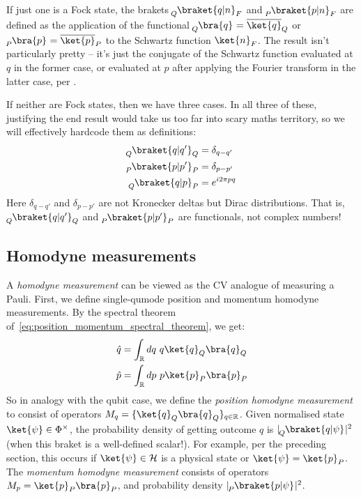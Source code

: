 If just one is a Fock state, the brakets $\prepostsub{Q}{\braket{q | n}}{F}$ and $\prepostsub{P}{\braket{p | n}}{F}$ are defined as the application of the functional $\presub{Q}{\bra{q}} = \overline{\ket{q}}_Q$ or $\presub{P}{\bra{p}} = \overline{\ket{p}}_P$ to the Schwartz function $\ket{n}_F$.
The result isn't particularly pretty -- it's just the conjugate of the Schwartz function evaluated at $q$ in the former case, or evaluated at $p$ after applying the Fourier transform in the latter case, per .

If neither are Fock states, then we have three cases.
In all three of these, justifying the end result would take us too far into scary maths territory, so we will effectively hardcode them as definitions:
\begin{equation}
    \begin{aligned}
        \prepostsub{Q}{\braket{q | q'}}{Q} &= \delta_{q - q'} \\
        \prepostsub{P}{\braket{p | p'}}{P} &= \delta_{p - p'} \\
        \prepostsub{Q}{\braket{q | p}}{P} &= e^{i 2\pi p q}
    \end{aligned}
\end{equation}
Here $\delta_{q - q'}$ and $\delta_{p - p'}$ are not Kronecker deltas but Dirac distributions.
That is, $\prepostsub{Q}{\braket{q | q'}}{Q}$ and $\prepostsub{P}{\braket{p | p'}}{P}$ are functionals, not complex numbers!

\subsection{Homodyne measurements}

A \textit{homodyne measurement} can be viewed as the CV analogue of measuring a Pauli.
First, we define single-qumode position and momentum homodyne measurements.
By the spectral theorem of~\eqref{eq:position_momentum_spectral_theorem}, we get:
\begin{equation}\label{eq:position_momentum_eigendecomposed}
    \begin{aligned}
        \hat{q} &= \int_{\mathbb{R}} dq\ q \ket{q}_Q \bra{q}_Q \\
        \hat{p} &= \int_{\mathbb{R}} dp\ p \ket{p}_P \bra{p}_P
    \end{aligned}
\end{equation}
So in analogy with the qubit case, we define the \textit{position homodyne measurement} to consist of operators $M_q = \{\ket{q}_Q \bra{q}_Q\}_{q \in \mathbb{R}}$.
Given normalised state $\ket{\psi} \in \Phi^\times$, the probability density of getting outcome $q$ is $|\presub{Q}{\braket{q|\psi}}|^2$ (when this braket is a well-defined scalar!).
For example, per the preceding section, this occurs if $\ket{\psi} \in \HHH$ is a physical state or $\ket{\psi} = \ket{p}_P$.
The \textit{momentum homodyne measurement} consists of operators $M_p = \ket{p}_P\bra{p}_P$, and probability density $|\presub{P}{\braket{p|\psi}}|^2$.

